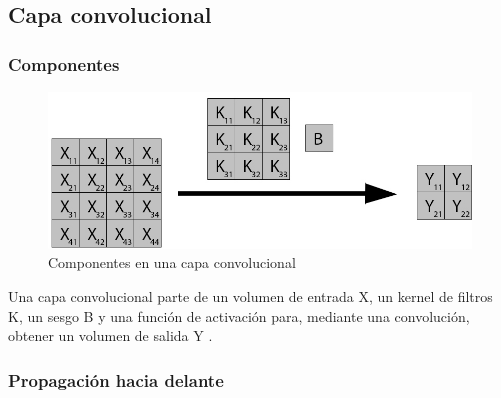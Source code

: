\subsection{Capa convolucional}

\subsubsection{Componentes}


\begin{figure}[H]
	\centering
	\includegraphics[scale=0.35]{imagenes/conv_nombres.jpg}  
	\caption{Componentes en una capa convolucional}
	\label{fig:Componentes_convolucion}
\end{figure}

Una capa convolucional parte de un volumen de entrada X, un kernel de filtros K, un sesgo B y una función de activación para, mediante una convolución, obtener un volumen de salida Y \cite{capa_convolucional} \cite{capa_convolucional_Stanford}.

\subsubsection{Propagación hacia delante}


